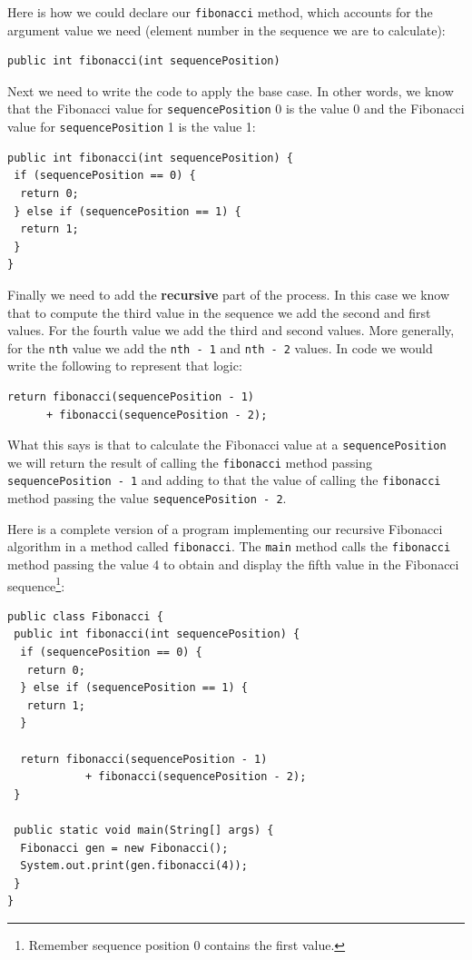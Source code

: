 Here is how we could declare our \texttt{fibonacci} method, which accounts for the argument value we need (element number in the sequence we are to calculate):

\beforeverb
\begin{verbatim}
public int fibonacci(int sequencePosition) 
\end{verbatim}
\afterverb

Next we need to write the code to apply the base case. In other words, we know that the Fibonacci value for \texttt{sequencePosition} 0 is the value 0 and the Fibonacci value for \texttt{sequencePosition} 1 is the value 1:

\beforeverb
\begin{verbatim}
public int fibonacci(int sequencePosition) {
 if (sequencePosition == 0) {
  return 0;
 } else if (sequencePosition == 1) {
  return 1;
 }
}
\end{verbatim}
\afterverb

Finally we need to add the \textbf{recursive} part of the process. In this case we know that to compute the third value in the sequence we add the second and first values. For the fourth value we add the third and second values. More generally, for the \texttt{nth} value we add the \texttt{nth~-~1} and \texttt{nth~-~2} values. In code we would write the following to represent that logic:

\beforeverb
\begin{verbatim}
return fibonacci(sequencePosition - 1) 
      + fibonacci(sequencePosition - 2);
\end{verbatim}
\afterverb

What this says is that to calculate the Fibonacci value at a \texttt{sequencePosition} we will return the result of calling the \texttt{fibonacci} method passing \texttt{sequencePosition~-~1} and adding to that the value of calling the \texttt{fibonacci} method passing the value \texttt{sequencePosition~-~2}.

\pagebreak

Here is a complete version of a program implementing our recursive Fibonacci algorithm in a method called \texttt{fibonacci}. The \texttt{main} method calls the \texttt{fibonacci} method passing the value 4 to obtain and display the fifth value in the Fibonacci sequence\footnote{Remember sequence position 0 contains the first value.}:

\beforeverb
\begin{verbatim}
public class Fibonacci {
 public int fibonacci(int sequencePosition) {
  if (sequencePosition == 0) {
   return 0;
  } else if (sequencePosition == 1) {
   return 1;
  }

  return fibonacci(sequencePosition - 1)
            + fibonacci(sequencePosition - 2);
 }

 public static void main(String[] args) {
  Fibonacci gen = new Fibonacci();
  System.out.print(gen.fibonacci(4));
 }
}
\end{verbatim}
\afterverb

